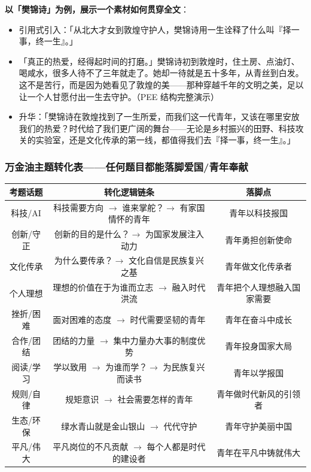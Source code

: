 \textbf{以「樊锦诗」为例，展示一个素材如何贯穿全文}：

\begin{itemize}
  \item[\textbf{开头段}] 引用式引入：「从北大才女到敦煌守护人，樊锦诗用一生诠释了什么叫『择一事，终一生』。」
  \item[\textbf{主体段分论点}]「真正的热爱，经得起时间的打磨。」樊锦诗初到敦煌时，住土房、点油灯、喝咸水，很多人待不了三年就走了。她却一待就是五十多年，从青丝到白发。这不是苦行，而是因为她看见了敦煌的美——那种穿越千年的文明之美，足以让一个人甘愿付出一生去守护。（PEE 结构完整演示）
  \item[\textbf{结尾段}] 升华：「樊锦诗在敦煌找到了一生所爱，而我们这一代青年，又该在哪里安放我们的热爱？时代给了我们更广阔的舞台——无论是乡村振兴的田野、科技攻关的实验室，还是文化传承的第一线，都值得我们去『择一事，终一生』。」
\end{itemize}

\subsubsection{万金油主题转化表——任何题目都能落脚爱国/青年奉献}

\begin{center}
\begin{tabular}{c|c|c}
\textbf{考题话题} & \textbf{转化逻辑链条} & \textbf{落脚点} \\ \hline
科技/AI & 科技需要方向 $\to$ 谁来掌舵？$\to$ 有家国情怀的青年 & 青年以科技报国 \\
创新/守正 & 创新的目的是什么？$\to$ 为国家发展注入动力 & 青年勇担创新使命 \\
文化传承 & 为什么要传承？$\to$ 文化自信是民族复兴之基 & 青年做文化传承者 \\
个人理想 & 理想的价值在于为谁而立志 $\to$ 融入时代洪流 & 青年把个人理想融入国家需要 \\
挫折/困难 & 面对困难的态度 $\to$ 时代需要坚韧的青年 & 青年在奋斗中成长 \\
合作/团结 & 团结的力量 $\to$ 集中力量办大事的制度优势 & 青年投身国家大局 \\
阅读/学习 & 学以致用 $\to$ 为谁而学？$\to$ 为民族复兴而读书 & 青年以学报国 \\
规则/自律 & 规矩意识 $\to$ 社会需要怎样的青年 & 青年做时代新风的引领者 \\
生态/环保 & 绿水青山就是金山银山 $\to$ 代代守护 & 青年守护美丽中国 \\
平凡/伟大 & 平凡岗位的不凡贡献 $\to$ 每个人都是时代的建设者 & 青年在平凡中铸就伟大 \\
\end{tabular}
\end{center}

